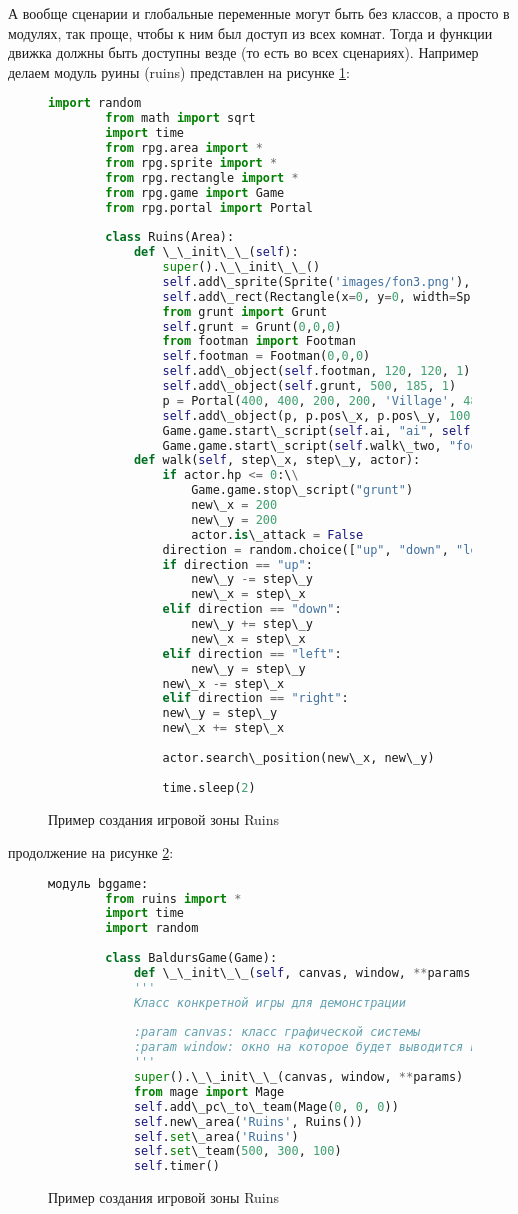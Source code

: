 А вообще сценарии и глобальные переменные могут быть без классов, а просто в модулях, так проще, чтобы к ним был доступ из всех комнат. Тогда и функции движка должны быть доступны везде (то есть во всех сценариях). Например делаем модуль руины (ruins) представлен на рисунке \ref{ruins:image}:
\begin{figure}[H]
	\begin{lstlisting}[language=Python]
		import random
		from math import sqrt
		import time
		from rpg.area import *
		from rpg.sprite import *
		from rpg.rectangle import *
		from rpg.game import Game
		from rpg.portal import Portal
		
		class Ruins(Area):
			def \_\_init\_\_(self):
				super().\_\_init\_\_()
				self.add\_sprite(Sprite('images/fon3.png'), 590, 400, 0)
				self.add\_rect(Rectangle(x=0, y=0, width=Sprite('images/fon3.png').image.width(), height=Sprite('images/fon3.png').image.height()))
				from grunt import Grunt
				self.grunt = Grunt(0,0,0)
				from footman import Footman
				self.footman = Footman(0,0,0)
				self.add\_object(self.footman, 120, 120, 1)
				self.add\_object(self.grunt, 500, 185, 1)
				p = Portal(400, 400, 200, 200, 'Village', 480, 100)
				self.add\_object(p, p.pos\_x, p.pos\_y, 100)
				Game.game.start\_script(self.ai, "ai", self.grunt)
				Game.game.start\_script(self.walk\_two, "footman", 50, 50)
			def walk(self, step\_x, step\_y, actor):
				if actor.hp <= 0:\\
					Game.game.stop\_script("grunt")
					new\_x = 200
					new\_y = 200
					actor.is\_attack = False
				direction = random.choice(["up", "down", "left", "right"])
				if direction == "up":
					new\_y -= step\_y
					new\_x = step\_x
				elif direction == "down":
					new\_y += step\_y
					new\_x = step\_x
				elif direction == "left":
					new\_y = step\_y
				new\_x -= step\_x
				elif direction == "right":
				new\_y = step\_y
				new\_x += step\_x
		
				actor.search\_position(new\_x, new\_y)
		
				time.sleep(2)
\end{lstlisting}  
\caption{Пример создания игровой зоны Ruins}
\label{ruins:image}
\end{figure}
продолжение на рисунке \ref{ruins2:image}:
\begin{figure}[H]
	\begin{lstlisting}[language=Python]		
		модуль bggame:
		from ruins import *
		import time
		import random
		
		class BaldursGame(Game):
			def \_\_init\_\_(self, canvas, window, **params):
			'''
			Класс конкретной игры для демонстрации
		
			:param canvas: класс графической системы
			:param window: окно на которое будет выводится игра
			'''
			super().\_\_init\_\_(canvas, window, **params)
			from mage import Mage
			self.add\_pc\_to\_team(Mage(0, 0, 0))
			self.new\_area('Ruins', Ruins())
			self.set\_area('Ruins')
			self.set\_team(500, 300, 100)
			self.timer()
	\end{lstlisting}  
	\caption{Пример создания игровой зоны Ruins}
	\label{ruins2:image}
\end{figure}


